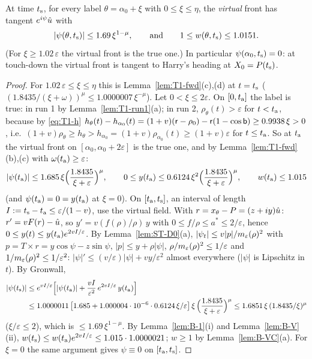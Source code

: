 \begin{lemma}\label{lem:T1-virt}
At time $t_{\mathrm s}$, for every label $\theta=\alpha_0+\xi$ with $0\le\xi\le\eta$, the \emph{virtual} front has tangent $e^{i\psi}\hat u$ with
\[
|\psi(\theta,t_{\mathrm s})|\le1.69\,\xi^{1-\mu},\qquad\text{and}\qquad1\le w(\theta,t_{\mathrm s})\le1.0151 .
\]
(For $\xi\ge1.02\,\varepsilon$ the virtual front is the true one.) In particular $\psi(\alpha_0,t_{\mathrm s})=0$: at touch-down the virtual
front is tangent to Harry's heading at $X_0=P(t_{\mathrm s})$.
\end{lemma}
\begin{proof}
For $1.02\,\varepsilon\le\xi\le\eta$ this is Lemma~\ref{lem:T1-fwd}(c),(d) at $t=t_{\mathrm s}$
($(1.8435/(\xi+\omega))^\mu\le1.0000007\,\xi^{-\mu}$). Let $0<\xi\le2\varepsilon$. On $[0,t_{\mathrm a}]$ the label is true: in run 1 by
Lemma~\ref{lem:T1-run1}(a); in run 2, $\rho_\theta(t)>\varepsilon$ for $t<t_{\mathrm a}$, because by \eqref{eq:T1-h}
$h_\theta(t)-h_{\alpha_0}(t)=(1+v)(\mathsf r-\rho_0)-\mathsf r(1-\cos\mathsf b)\ge0.9938\,\xi>0$, i.e.\
$(1+v)\rho_\theta\ge h_\theta>h_{\alpha_0}=(1+v)\rho_{\alpha_0}(t)\ge(1+v)\varepsilon$ for $t\le t_{\mathrm a}$. So at $t_{\mathrm a}$ the virtual front on
$[\alpha_0,\alpha_0+2\varepsilon]$ is the true one, and by Lemma~\ref{lem:T1-fwd}(b),(c) with $\omega(t_{\mathrm a})\ge\varepsilon$:
\[
|\psi(t_{\mathrm a})|\le1.685\,\xi\Bigl(\frac{1.8435}{\xi+\varepsilon}\Bigr)^\mu,\qquad
0\le y(t_{\mathrm a})\le0.6124\,\xi^2\Bigl(\frac{1.8435}{\xi+\varepsilon}\Bigr)^\mu,\qquad w(t_{\mathrm a})\le1.015
\]
(and $\psi(t_{\mathrm a})=0=y(t_{\mathrm a})$ at $\xi=0$). On $[t_{\mathrm a},t_{\mathrm s}]$, an interval of length $I:=t_{\mathrm s}-t_{\mathrm a}\le\varepsilon/(1-v)$, use the virtual
field. With $r=x_\theta-P=(z+iy)\hat u$: $r'=vF(r)-\hat u$, so $y'=v(f(\rho)/\rho)\,y$ with $0\le f/\rho\le a^*\le2/\varepsilon$, hence
$0\le y(t)\le y(t_{\mathrm a})e^{2vI/\varepsilon}$. By Lemma~\ref{lem:ST-D0}(a), $|\psi_t|\le v|p|/m_\varepsilon(\rho)^2$ with
$p=T\times r=y\cos\psi-z\sin\psi$, $|p|\le y+\rho|\psi|$, $\rho/m_\varepsilon(\rho)^2\le1/\varepsilon$ and $1/m_\varepsilon(\rho)^2\le1/\varepsilon^2$:
$|\psi|'\le(v/\varepsilon)|\psi|+vy/\varepsilon^2$ almost everywhere ($|\psi|$ is Lipschitz in $t$). By Gronwall,
\begin{align*}
|\psi(t_{\mathrm s})|&\le e^{vI/\varepsilon}\Bigl[|\psi(t_{\mathrm a})|+\frac{vI}{\varepsilon^2}\,e^{2vI/\varepsilon}\,y(t_{\mathrm a})\Bigr]\\
&\le1.0000011\,\bigl[1.685+1.000004\cdot10^{-6}\cdot0.6124\,\xi/\varepsilon\bigr]\,\xi\,\Bigl(\frac{1.8435}{\xi+\varepsilon}\Bigr)^\mu
\le1.6851\,\xi\,(1.8435/\xi)^\mu
\end{align*}
($\xi/\varepsilon\le2$), which is $\le1.69\,\xi^{1-\mu}$. By Lemma~\ref{lem:B-1}(i) and Lemma~\ref{lem:B-V}(ii),
$w(t_{\mathrm s})\le w(t_{\mathrm a})e^{2vI/\varepsilon}\le1.015\cdot1.0000021$; $w\ge1$ by Lemma~\ref{lem:B-VC}(a). For $\xi=0$ the same argument gives
$\psi\equiv0$ on $[t_{\mathrm a},t_{\mathrm s}]$.
\end{proof}

